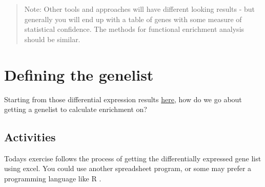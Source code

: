\documentclass[
]{book}
\begin{document}
\begin{quote}
Note: Other tools and approaches will have different looking results - but generally you will end up with a table of genes with some measure of statistical confidence.
The methods for functional enrichment analysis should be similar.
\end{quote}

\chapter{Defining the genelist}\label{defining-the-genelist}

Starting from those differential expression results \href{http://degust.erc.monash.edu/degust/compare.html?code=5b2c7805ab8f8c5f2dc8c72e61b049b0\#?plot=mds}{here}, how do we go about getting a genelist to calculate enrichment on?

\section{Activities}\label{activities}

Todays exercise follows the process of getting the differentially expressed gene list using excel. You could use another spreadsheet program, or some may prefer a programming language like R .
\end{document}
